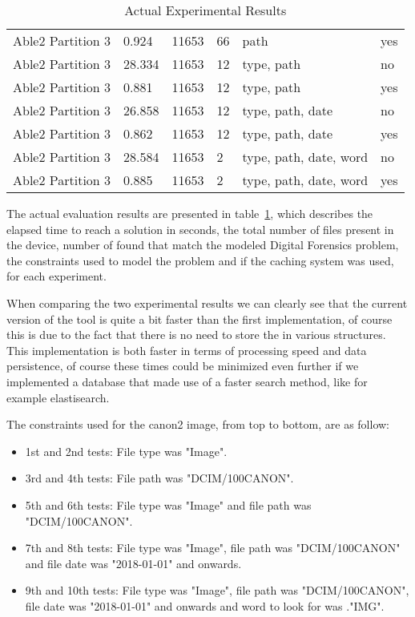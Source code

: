 \begin{table}[ht]
\begin{tabular}{|p{3cm}||p{1cm}|p{2cm}|p{1.5cm}|p{3.5cm}|p{1.5cm}|}
        Able2 Partition 3  & 0.924 & 11653 & 66 & path & yes \\
        Able2 Partition 3  & 28.334 & 11653 & 12 & type, path & no \\
        Able2 Partition 3  & 0.881 & 11653 & 12 & type, path & yes \\
        Able2 Partition 3  & 26.858 & 11653 & 12 & type, path, date & no \\
        Able2 Partition 3  & 0.862 & 11653 & 12 & type, path, date & yes \\
        Able2 Partition 3  & 28.584 & 11653 & 2 & type, path, date, word & no \\
        Able2 Partition 3  & 0.885 & 11653 & 2 & type, path, date, word & yes \\
        \hline
    \end{tabular}
    \caption{Actual Experimental Results}
    \label{tab:results}
\end{table}

The actual evaluation results are presented in table~\ref{tab:results}, which describes the elapsed time to reach a solution in seconds, the total number of files present in the device, number of \INODES found that match the modeled Digital Forensics problem, the constraints used to model the problem and if the caching system was used, for each experiment.

When comparing the two experimental results we can clearly see that the current version of the tool is quite a bit faster than the first implementation, of course this is due to the fact that there is no need to store the \INODES in various structures. This implementation is both faster in terms of processing speed and data persistence, of course these times could be minimized even further if we implemented a database that made use of a faster search method, like for example elastisearch. 

The constraints used for the canon2 image, from top to bottom, are as follow:
\begin{itemize}
    \item 1st and 2nd tests: File type was "Image".
    \item 3rd and 4th tests: File path was "DCIM/100CANON".
    \item 5th and 6th tests: File type was "Image" and file path was "DCIM/100CANON".
    \item 7th and 8th tests: File type was "Image", file path was "DCIM/100CANON" and file date was "2018-01-01" and onwards.
    \item 9th and 10th tests: File type was "Image", file path was "DCIM/100CANON", file date was "2018-01-01" and onwards and word to look for was ."IMG".
\end{itemize}

